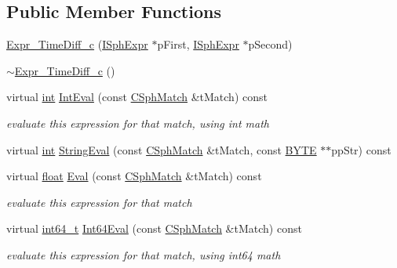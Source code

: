 \subsection*{Public Member Functions}
\begin{DoxyCompactItemize}
\item 
\hyperlink{structExpr__TimeDiff__c_aa6b242096cd6a3c6fc46b179584ea702}{Expr\-\_\-\-Time\-Diff\-\_\-c} (\hyperlink{structISphExpr}{I\-Sph\-Expr} $\ast$p\-First, \hyperlink{structISphExpr}{I\-Sph\-Expr} $\ast$p\-Second)
\item 
\hyperlink{structExpr__TimeDiff__c_a7df656e924d4850951395fe120201e6b}{$\sim$\-Expr\-\_\-\-Time\-Diff\-\_\-c} ()
\item 
virtual \hyperlink{sphinxexpr_8cpp_a4a26e8f9cb8b736e0c4cbf4d16de985e}{int} \hyperlink{structExpr__TimeDiff__c_ac2c35a04b915ca4df4f89c9aa0f19f74}{Int\-Eval} (const \hyperlink{classCSphMatch}{C\-Sph\-Match} \&t\-Match) const 
\begin{DoxyCompactList}\small\item\em evaluate this expression for that match, using int math \end{DoxyCompactList}\item 
virtual \hyperlink{sphinxexpr_8cpp_a4a26e8f9cb8b736e0c4cbf4d16de985e}{int} \hyperlink{structExpr__TimeDiff__c_abfe361018bfe51033792ece31973d30b}{String\-Eval} (const \hyperlink{classCSphMatch}{C\-Sph\-Match} \&t\-Match, const \hyperlink{sphinxstd_8h_a4ae1dab0fb4b072a66584546209e7d58}{B\-Y\-T\-E} $\ast$$\ast$pp\-Str) const 
\item 
virtual \hyperlink{sphinxexpr_8cpp_a0e0d0739f7035f18f949c2db2c6759ec}{float} \hyperlink{structExpr__TimeDiff__c_a2ef64802064b8be978ca51d628f5e4ad}{Eval} (const \hyperlink{classCSphMatch}{C\-Sph\-Match} \&t\-Match) const 
\begin{DoxyCompactList}\small\item\em evaluate this expression for that match \end{DoxyCompactList}\item 
virtual \hyperlink{sphinxstd_8h_a996e72f71b11a5bb8b3b7b6936b1516d}{int64\-\_\-t} \hyperlink{structExpr__TimeDiff__c_a16b8bd29d6f901378d023b23b7f7fc16}{Int64\-Eval} (const \hyperlink{classCSphMatch}{C\-Sph\-Match} \&t\-Match) const 
\begin{DoxyCompactList}\small\item\em evaluate this expression for that match, using int64 math \end{DoxyCompactList}\item 
$$
\end{DoxyCompactItemize}
